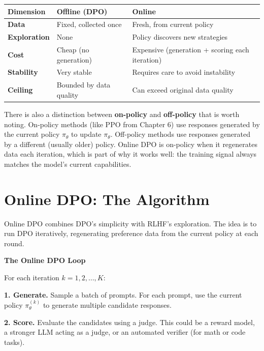 \begin{chapterenv}
\begin{center}
\begin{tabular}{p{}p{}p{}}
\toprule
\textbf{Dimension} & \textbf{Offline (DPO)} & \textbf{Online} \\
\midrule
\textbf{Data} & Fixed, collected once & Fresh, from current policy \\
\textbf{Exploration} & None & Policy discovers new strategies \\
\textbf{Cost} & Cheap (no generation) & Expensive (generation + scoring each iteration) \\
\textbf{Stability} & Very stable & Requires care to avoid instability \\
\textbf{Ceiling} & Bounded by data quality & Can exceed original data quality \\
\bottomrule
\end{tabular}
\end{center}

There is also a distinction between \textbf{on-policy} and \textbf{off-policy} that is worth noting. On-policy methods (like PPO from Chapter 6) use responses generated by the current policy $\pi_\theta$ to update $\pi_\theta$. Off-policy methods use responses generated by a different (usually older) policy. Online DPO is on-policy when it regenerates data each iteration, which is part of why it works well: the training signal always matches the model's current capabilities.

\section{Online DPO: The Algorithm}

Online DPO combines DPO's simplicity with RLHF's exploration. The idea is to run DPO iteratively, regenerating preference data from the current policy at each round.

\begin{infobox}
\textbf{The Online DPO Loop}

For each iteration $k = 1, 2, \ldots, K$:

\textbf{1. Generate.} Sample a batch of prompts. For each prompt, use the current policy $\pi_\theta^{(k)}$ to generate multiple candidate responses.

\textbf{2. Score.} Evaluate the candidates using a judge. This could be a reward model, a stronger LLM acting as a judge, or an automated verifier (for math or code tasks).


\end{infobox}
\end{chapterenv}
